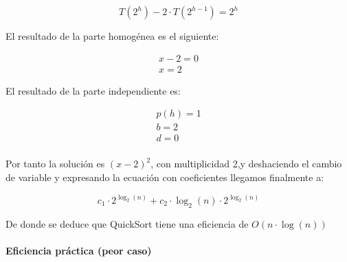 \documentclass[a4paper,12pt]{article} %
\begin{document}
\begin{equation*}
	T(2^{h}) - 2\cdot T(2^{h-1}) = 2^{h}
\end{equation*}

El resultado de la parte homogénea es el siguiente:

\begin{align*}
	x - 2 = 0 \\
	x = 2
\end{align*}

El resultado de la parte independiente es:

\begin{align*}
	p(h) = 1 \\
	b = 2    \\
	d = 0    \\
\end{align*}

Por tanto la solución es $(x-2)^2$, con multiplicidad 2,y deshaciendo el
cambio de variable y expresando la ecuación con coeficientes llegamos finalmente
a:

\begin{equation*}
	c_{1}\cdot 2^{\log _{2}(n)} + c_{2}\cdot \log_{2}(n)\cdot 2^{\log_{2}(n)}
\end{equation*}

De donde se deduce que QuickSort tiene una eficiencia de $O(n\cdot \log(n))$
\\

\paragraph{Eficiencia práctica (peor caso)}
\end{document}
